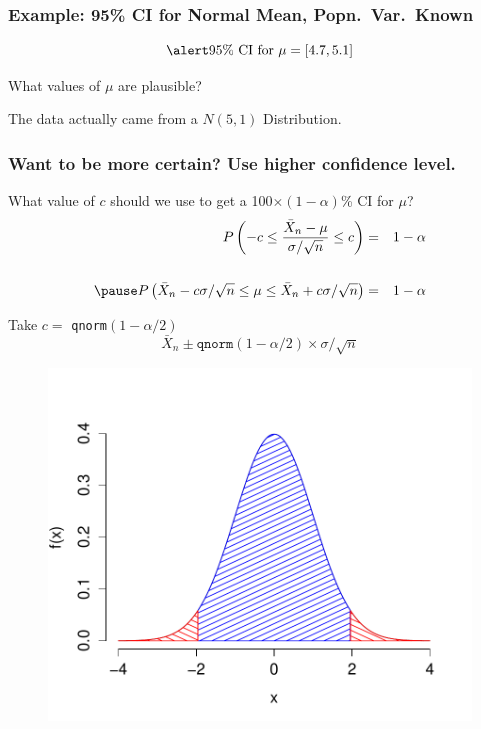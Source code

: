 \documentclass[handout]{beamer}
\begin{document}
\begin{frame}
\frametitle{Example: 95\% CI for Normal Mean, Popn.\ Var.\ Known}

\begin{center}
\end{center}

	$$\alert{\mbox{95\% CI for } \mu = [4.7, 5.1]}$$

What values of $\mu$ are plausible?

\pause
\vspace{1em}

\alert{The data actually came from a $N(5,1)$ Distribution.}

\end{frame}
\begin{frame}
\frametitle{Want to be more certain? Use higher confidence level.}
What value of $c$ should we use to get a 100$\times(1-\alpha)$\% CI for $\mu$?
	\begin{eqnarray*}
		P\left(-c \leq \frac{\bar{X}_n-\mu}{\sigma/\sqrt{n}} \leq c \right) &=& 1-\alpha \\ \\ \pause
		P\left(\bar{X}_n - c \sigma/\sqrt{n} \leq \mu\leq \bar{X}_n + c \sigma/\sqrt{n} \right) &=& 1-\alpha 
	\end{eqnarray*}
 \pause

\alert{Take $c =$ \texttt{qnorm}$(1-\alpha/2)$} \pause
	$$\bar{X}_n \pm \texttt{qnorm}(1-\alpha/2) \times \sigma/\sqrt{n}$$
\end{frame}
\begin{frame}
\begin{figure}
\centering
\includegraphics[scale = 0.6]{./images/normal_tails}
\end{figure}
\end{frame}
\end{document}
